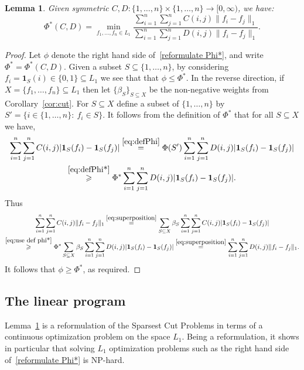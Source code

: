 \documentclass{icm2010}
\newtheorem{lemma}[theorem]{Lemma}
\theoremstyle{definition}
\newcommand{\1}{\mathbf{1}}
\renewcommand{\le}{\leqslant}
\renewcommand{\ge}{\geqslant}
\begin{document}
\begin{lemma}\label{lem:l1 enters}
Given symmetric $C,D:\{1,\ldots,n\}\times\{1,\ldots,n\}\to
[0,\infty)$, we have:
\begin{equation}\label{reformulate Phi*}
\Phi^*(C,D) = \min_{f_1,\ldots,f_n\in
L_1}\frac{\sum_{i=1}^n\sum_{j=1}^n C(i,j) \|f_i-f_j\|_1}
               {\sum_{i=1}^n\sum_{j=1}^n D(i,j)\|f_i-f_j\|_1}.
\end{equation}
\end{lemma}
\begin{proof}
Let $\phi$ denote the right hand side of~\eqref{reformulate Phi*},
and write $\Phi^*=\Phi^*(C,D)$. Given a subset $S\subseteq
\{1,\ldots, n\}$, by considering $f_i=\1_S(i)\in \{0,1\}\subseteq
L_1$ we see that that $\phi\le \Phi^*$. In the reverse direction, if
$X=\{f_1,\ldots,f_n\}\subseteq L_1$ then let
$\{\beta_S\}_{S\subseteq X}$ be the non-negative weights from
Corollary~\ref{cor:cut}. For $S\subseteq X$ define a subset of
$\{1,\ldots,n\}$ by $S'= \{i\in\{1,\ldots,n\}:\ f_i\in S\}$. It
follows from the definition of $\Phi^*$ that for all $S\subseteq X$
we have,
\begin{multline}\label{eq;use def phi*}
\sum_{i=1}^n\sum_{j=1}^n
C(i,j)|\1_S(f_i)-\1_{S}(f_j)|\stackrel{\eqref{eq:defPhi}}=\Phi(S')\sum_{i=1}^n\sum_{j=1}^n
D(i,j)|\1_S(f_i)-\1_{S}(f_j)|\\ \stackrel{\eqref{eq:defPhi*}}{\ge}
\Phi^*\sum_{i=1}^n\sum_{j=1}^n D(i,j)|\1_S(f_i)-\1_{S}(f_j)|.
\end{multline}
Thus
\begin{multline*}\label{eq:use cut}
\sum_{i=1}^n\sum_{j=1}^n
C(i,j)\|f_i-f_j\|_1\stackrel{\eqref{eq:superposition}}{=}\sum_{S\subseteq
X}\beta_S \sum_{i=1}^n\sum_{j=1}^n
C(i,j)|\1_S(f_i)-\1_{S}(f_j)|\\\stackrel{\eqref{eq;use def
phi*}}{\ge} \Phi^*\sum_{S\subseteq X}\beta_S\sum_{i=1}^n\sum_{j=1}^n
D(i,j)|\1_S(f_i)-\1_{S}(f_j)|\stackrel{\eqref{eq:superposition}}{=}\sum_{i=1}^n\sum_{j=1}^n
D(i,j)\|f_i-f_j\|_1.
\end{multline*}
It follows %
that $\phi\ge \Phi^*$, as
required.
\end{proof}


\subsection{The linear program}\label{sec:linear}

Lemma~\ref{lem:l1 enters} is a reformulation of the Sparsest Cut
Problems in terms of a continuous optimization problem on the space
$L_1$. Being a reformulation, it shows in particular that solving
$L_1$ optimization problems such as the right hand side
of~\eqref{reformulate Phi*} is NP-hard.
\end{document}
